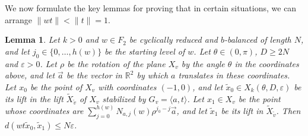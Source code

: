 \documentclass  [a4paper, 11pts] {article}
\newtheorem{lem}[thm]{Lemma}
\newcommand{\R}{\mathbb{R}}
\newcommand{\eps}{\varepsilon}
\begin{document}
We now formulate the key lemmas for proving that in certain situations, we can arrange $\|wt\| < \|t\|=1$.

\begin{lem}
\label{FlatkPos}
    Let $k > 0$ and $w\in F_2$ be cyclically reduced and $b$-balanced of length $N$, and let $j_0\in \{0, \ldots, h(w)\}$ be the starting level of $w$. Let $\theta\in (0, \pi)$, $D \ge 2N$ and $\eps > 0$. Let $\rho$ be the rotation of the plane $X_v$ by the angle $\theta$ in the coordinates above, and let $\vec{a}$ be the vector in $\R^2$ by which $a$ translates in these coordinates. Let $x_0$ be the point of $X_v$ with coordinates $(-1, 0)$, and let $\tilde{x}_0\in X_k(\theta, D, \eps)$ be its lift in the lift $\tilde{X}_{\tilde{v}}$ of $X_v$ stabilized by $G_v = \langle a, t\rangle$. Let $x_1\in X_v$ be the point whose coordinates are $\displaystyle \sum_{j=0}^{h(w)} N_{a,j}(w)\rho^{j_0-j}\vec{a}$, and let $\tilde{x}_1$ be its lift in $\tilde{X}_{\tilde{v}}$. Then $d(wt\tilde{x}_0, \tilde{x}_1) \le N\eps$.
\end{lem}
\end{document}
